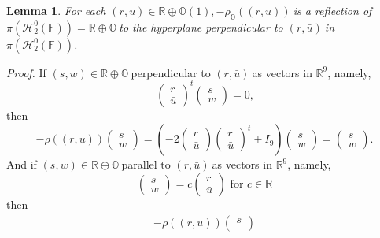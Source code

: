 \documentclass[a4paper]{article}%
\newtheorem{lemma}[theorem]{Lemma}
\newenvironment{proof}[1][Proof]{\noindent\textit{#1.} }{}
\begin{document}
\begin{lemma}
\label{OctRecVerLemma} For each $\left(  r,u\right)  \in\mathbb{R\oplus
O}\left(  1\right)  ,-\rho_{\mathbb{O}}\left(  \left(  r,u\right)  \right)
\ $is a reflection of $\pi\left(  \mathcal{H}_{2}^{0}(\mathbb{F})\right)
=\mathbb{R\oplus O}\ $to the hyperplane perpendicular to $\left(  r,\bar
{u}\right)  \ $in $\pi\left(  \mathcal{H}_{2}^{0}(\mathbb{F})\right)  $.
\end{lemma}

\begin{proof}
If $\left(  s,w\right)  \in\mathbb{R\oplus O\ }$perpendicular to $\left(
r,\bar{u}\right)  \ $as vectors in $\mathbb{R}^{9}$, namely,%
\[%
\begin{pmatrix}
r\\
\bar{u}%
\end{pmatrix}
^{t}%
\begin{pmatrix}
s\\
w
\end{pmatrix}
=0\text{,}%
\]
then
\[
-\rho\left(  \left(  r,u\right)  \right)
\begin{pmatrix}
s\\
w
\end{pmatrix}
=\left(  -2%
\begin{pmatrix}
r\\
\bar{u}%
\end{pmatrix}%
\begin{pmatrix}
r\\
\bar{u}%
\end{pmatrix}
^{t}+I_{9}\right)
\begin{pmatrix}
s\\
w
\end{pmatrix}
=%
\begin{pmatrix}
s\\
w
\end{pmatrix}
\text{.}%
\]
And if $\left(  s,w\right)  \in\mathbb{R\oplus O\ }$parallel to $\left(
r,\bar{u}\right)  \ $as vectors in $\mathbb{R}^{9}$, namely,%
\[%
\begin{pmatrix}
s\\
w
\end{pmatrix}
=c%
\begin{pmatrix}
r\\
\bar{u}%
\end{pmatrix}
\text{\ for }c\in\mathbb{R}%
\]
then
\begin{align*}
-\rho\left(  \left(  r,u\right)  \right)
\begin{pmatrix}
s\\

\end{pmatrix}
\end{align*}
\end{proof}
\end{document}
